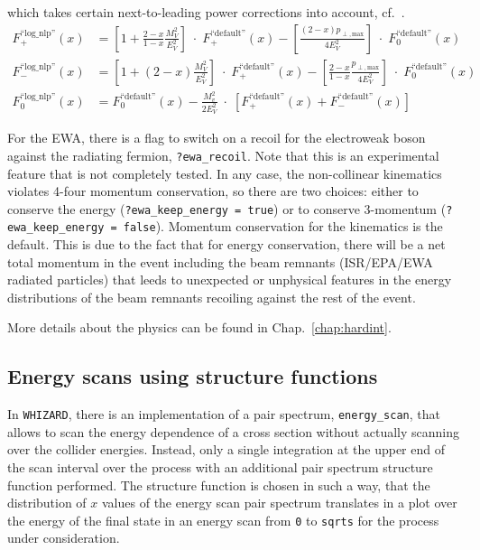 \documentclass[12pt]{book}
\newcommand{\ttt}[1]{\texttt{#1}}
\newcommand{\whizard}{\ttt{WHIZARD}}
\begin{document}
which takes certain next-to-leading power corrections into account,
cf.~\cite{Bigaran:2025rvb}. 
\begin{align}
  \label{eq:ewa_log_nlp}
  F^{\text{``log\_nlp''}}_{+}(x) &= \left[ 1 + \frac{2-x}{1-x}
    \frac{M_V^2}{E_V^2} \right] \; \cdot \;
  F^{\text{``default''}}_{+}(x) - \left[
    \frac{(2-x) p_{\perp,\textrm{max}}}{4 E_V^2} \right] \; \cdot \;
  F^{\text{``default''}}_{0}(x)
  \\
  F^{\text{``log\_nlp''}}_{-}(x) &= \left[ 1 + (2-x)
    \frac{M_V^2}{E_V^2} \right] \; \cdot \;
  F^{\text{``default''}}_{+}(x) - \left[
    \frac{2-x}{1-x} \frac{p_{\perp,\textrm{max}}}{4 E_V^2} \right] \;\cdot\;
  F^{\text{``default''}}_{0}(x) 
  \\
  F^{\text{``log\_nlp''}}_0(x) &=
  F^{\text{``default''}}_{0}(x)  - \frac{M_v^2}{2E_V^2} \;\cdot\;
  \left[F^{\text{``default''}}_{+}(x) + F^{\text{``default''}}_{-}(x)
    \right]
\end{align}

For the EWA, there is a flag to switch on a recoil for the
electroweak boson against the radiating fermion,
\ttt{?ewa\_recoil}. Note that this is an experimental feature that is
not completely tested. In any case, the non-collinear kinematics
violates 4-four momentum conservation, so there are two choices:
either to conserve the energy (\ttt{?ewa\_keep\_energy = true}) or to
conserve 3-momentum (\ttt{?ewa\_keep\_energy = false}). Momentum
conservation for the kinematics is the default. This is due to the
fact that for energy conservation, there will be a net total momentum
in the event including the beam remnants (ISR/EPA/EWA radiated
particles) that leeds to unexpected or unphysical features in the
energy distributions of the beam remnants recoiling against the rest
of the event.

More details about the physics can be found in
Chap.~\ref{chap:hardint}.



\subsection{Energy scans using structure functions}

In \whizard, there is an implementation of a pair spectrum,
\ttt{energy\_scan}, that allows to scan the energy dependence of a
cross section without actually scanning over the collider
energies. Instead, only a single integration at the upper end of the
scan interval over the process with an additional pair spectrum
structure function performed. The structure function is chosen
in such a way, that the distribution of $x$ values of the energy scan
pair spectrum translates in a plot over the energy of the final state
in an energy scan from \ttt{0} to \ttt{sqrts} for the process under
consideration.
\end{document}
